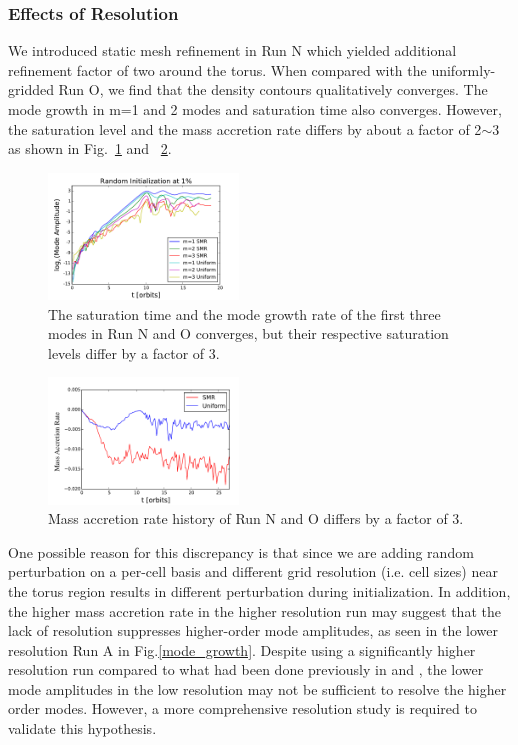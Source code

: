 \documentclass[iop,revtex4]{emulateapj}
\begin{document}
 \subsubsection{Effects of Resolution}
\par We introduced static mesh refinement in Run N which yielded additional refinement factor of two around the torus. When compared with the uniformly-gridded Run O, we find that the density contours qualitatively converges. The mode growth in m=1 and 2 modes and saturation time also converges. However, the saturation level and the mass accretion rate differs by about a factor of 2$\sim$3 as shown in Fig.~\ref{sat_level_comp} and ~\ref{mass_acc_comp}. 
\begin{figure}[ht]
\includegraphics[width=0.45\textwidth]{plots/randinit1percent_smr.pdf}
\caption{The saturation time and the mode growth rate of the first three modes in Run N and O converges, but their respective saturation levels differ by a factor of 3.}
\label{sat_level_comp}
\end{figure}
\begin{figure}[ht]
\includegraphics[width=0.45\textwidth,trim = 0 0 0 10 ]{plots/mass_accretion_smr.pdf}
\caption{Mass accretion rate history of Run N and O differs by a factor of 3.}
\label{mass_acc_comp}
\end{figure}
\par One possible reason for this discrepancy is that since we are adding random perturbation on a per-cell basis and different grid resolution (i.e. cell sizes) near the torus region results in different perturbation during initialization. In addition, the higher mass accretion rate in the higher resolution run may suggest that the lack of resolution suppresses higher-order mode amplitudes, as seen in the lower resolution Run A in Fig.\ref{mode_growth}. Despite using a significantly higher resolution run compared to what had been done previously in \cite{Hawley:1990A} and \cite{Hawley:1991A}, the lower mode amplitudes in the low resolution  may not be sufficient to resolve the higher order modes. However, a more comprehensive resolution study is required to validate this hypothesis.
\end{document}
